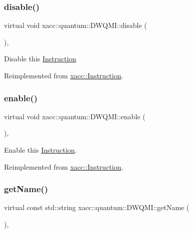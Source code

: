 \mbox{\label{a00987_af6d9120d8f60984767a330d5cfe9140f}} 
\subsubsection{\texorpdfstring{disable()}{disable()}}
{\footnotesize\ttfamily virtual void xacc\+::quantum\+::\+D\+W\+Q\+M\+I\+::disable (\begin{DoxyParamCaption}{ }\end{DoxyParamCaption})\hspace{0.3cm}{\ttfamily [inline]}, {\ttfamily [virtual]}}

Disable this \hyperlink{a01155}{Instruction} 

Reimplemented from \hyperlink{a01155_a6e528da15e05a94cc1d7db268c483271}{xacc\+::\+Instruction}.

\mbox{\label{a00987_ae4f563cead75aaa43f06db83e90ee855}} 
\subsubsection{\texorpdfstring{enable()}{enable()}}
{\footnotesize\ttfamily virtual void xacc\+::quantum\+::\+D\+W\+Q\+M\+I\+::enable (\begin{DoxyParamCaption}{ }\end{DoxyParamCaption})\hspace{0.3cm}{\ttfamily [inline]}, {\ttfamily [virtual]}}

Enable this \hyperlink{a01155}{Instruction}. 

Reimplemented from \hyperlink{a01155_a0b4f2e5a591af28342a3c08e4305e24f}{xacc\+::\+Instruction}.

\mbox{\label{a00987_ad93428eb61adade7bb99c7633bb02aca}} 
\subsubsection{\texorpdfstring{get\+Name()}{getName()}}
{\footnotesize\ttfamily virtual const std\+::string xacc\+::quantum\+::\+D\+W\+Q\+M\+I\+::get\+Name (\begin{DoxyParamCaption}{ }\end{DoxyParamCaption})\hspace{0.3cm}{\ttfamily [inline]}, {\ttfamily [virtual]}}

